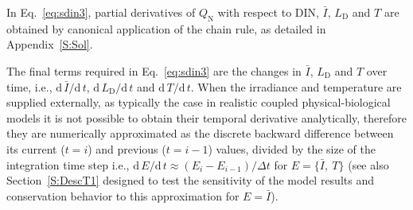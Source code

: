 \documentclass[gmd, manuscript]{copernicus}
\begin{document}
In Eq.~\eqref{eq:sdin3}, partial derivatives of $Q_{\text{N}}$ with respect to DIN, $\bar{I}$, $L_{\text{D}}$ and $T$ are obtained by canonical application of the chain rule, as detailed in Appendix~\ref{S:Sol}.  

The final terms required in Eq.~\eqref{eq:sdin3} are the changes in $\bar{I}$, $L_{\text{D}}$ and $T$ over time, i.e., $\text{d}\,\bar{I} / \text{d}\,t$, $\text{d}\,L_{\text{D}} / \text{d}\,t$
and $\text{d}\,T / \text{d}\,t$.
When the irradiance and temperature are supplied externally, as typically the case in realistic coupled physical-biological models it is not possible to obtain their temporal derivative analytically, therefore they are numerically approximated as the discrete backward difference between its current ($t=i$) and previous ($t=i-1$) values, divided by the size of the integration time step i.e., $\text{d}\, E / \text{d}\, t \approx (E_{i} - E_{i-1}) / \Delta t$ for $E=\{\bar{I},\ T\}$ (see also Section~\ref{S:DescT1} designed to test the sensitivity of the model results and conservation behavior to this approximation for $E=\bar{I}$).
\end{document}
